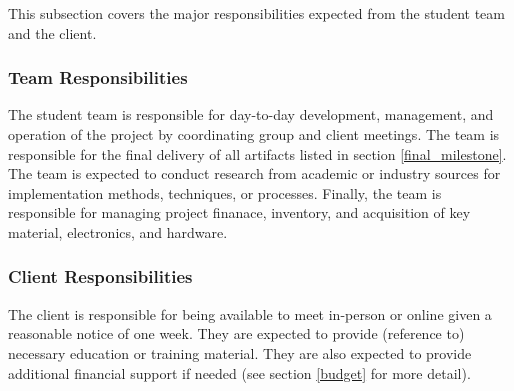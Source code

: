 This subsection covers the major responsibilities expected from the 
student team and the client.

\subsubsection{Team Responsibilities}
The student team is responsible for day-to-day development, management, and
operation of the project by coordinating group and client meetings. The
team is responsible for the final delivery of all artifacts listed in section
\ref{final_milestone}.
The team is expected to conduct research from academic or industry sources
for implementation methods, techniques, or processes.
Finally, the team is responsible for managing project finanace, inventory,
and acquisition of key material, electronics, and hardware.

\subsubsection{Client Responsibilities}
The client is responsible for being available to meet in-person or online
given a reasonable notice of one week. They are expected to provide
(reference to) necessary education or training material. They are also expected
to provide additional financial support if needed (see section \ref{budget} for
more detail).
